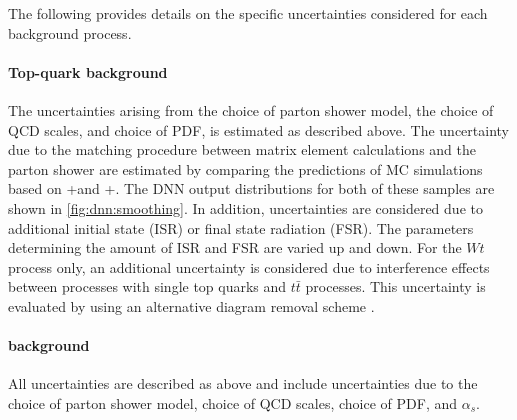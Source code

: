 \noindent The following provides details on the specific uncertainties considered for each background process. 
\paragraph{Top-quark background}
The uncertainties arising from the choice of parton shower model, the choice of QCD scales, and choice of PDF, is estimated as described above. 
The uncertainty due to the matching procedure between matrix element calculations and the parton shower are estimated by comparing the predictions of MC simulations based on \Powheg+\PYTHIA[8] and \aMCATNLO+\PYTHIA[8]. 
The DNN output distributions for both of these samples are shown in \cref{fig:dnn:smoothing}. 
In addition, uncertainties are considered due to additional initial state (ISR) or final state radiation (FSR). The parameters determining the amount of ISR and FSR are varied up and down.
For the $Wt$ process only, an additional uncertainty is considered due to interference effects between processes with single top quarks and $t\bar{t}$ processes. This uncertainty is evaluated by using an alternative diagram removal scheme \cite{Frixione:2008yi}. %

\paragraph{\Ztautau background}
All uncertainties are described as above and include uncertainties due to the choice of parton shower model, choice of QCD scales, choice of PDF, and $\alpha_s$.

